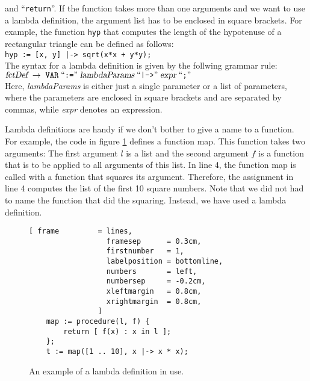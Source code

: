 and ``\texttt{return}''.
If the function takes more than one arguments and we want to use a lambda definition, the argument
list has to be enclosed in square brackets.  For example, the function \texttt{hyp} that computes
the length of the hypotenuse of a rectangular triangle can be defined as follows:
\\[0.2cm]
\hspace*{1.3cm}
\texttt{hyp := [x, y] |-> sqrt(x*x + y*y);}
\\[0.2cm]
The syntax for a lambda definition is given by the follwing grammar rule:
\\[0.2cm]
\hspace*{1.3cm}
$\textsl{fctDef} \;\rightarrow\; \mathtt{VAR} \;\mbox{``\texttt{:=}''}\; \textsl{lambdaParams} \;\mbox{``\texttt{|->}''}\; \textsl{expr} \;\mbox{``\texttt{;}''}\;$
\\[0.2cm]
Here, \textsl{lambdaParams} is either just a single parameter or a list of parameters, where the
parameters are enclosed in square brackets and are separated by commas, while
\textsl{expr} denotes an expression.

Lambda definitions are handy if we don't bother to give a name to a function.
For example, the code in figure \ref{fig:lambda.stlx} defines a function map.  This function takes
two arguments: The first argument $l$ is a list and the second argument $f$ is a function that is to
be applied to all arguments of this list.  In line 4, the function map is called with a function
that squares its argument.  Therefore, the assignment in line 4 computes the list of the first 10
square numbers.  Note that we did not had to name the function that did the squaring.  Instead, we
have  used a lambda definition.

\begin{figure}[!ht]
\centering
\begin{Verbatim}[ frame         = lines, 
                  framesep      = 0.3cm, 
                  firstnumber   = 1,
                  labelposition = bottomline,
                  numbers       = left,
                  numbersep     = -0.2cm,
                  xleftmargin   = 0.8cm,
                  xrightmargin  = 0.8cm,
                ]
    map := procedure(l, f) {
        return [ f(x) : x in l ];
    };    
    t := map([1 .. 10], x |-> x * x);
\end{Verbatim}
\vspace*{-0.3cm}
\caption{An example of a lambda definition in use.}
\label{fig:lambda.stlx}
\end{figure}

